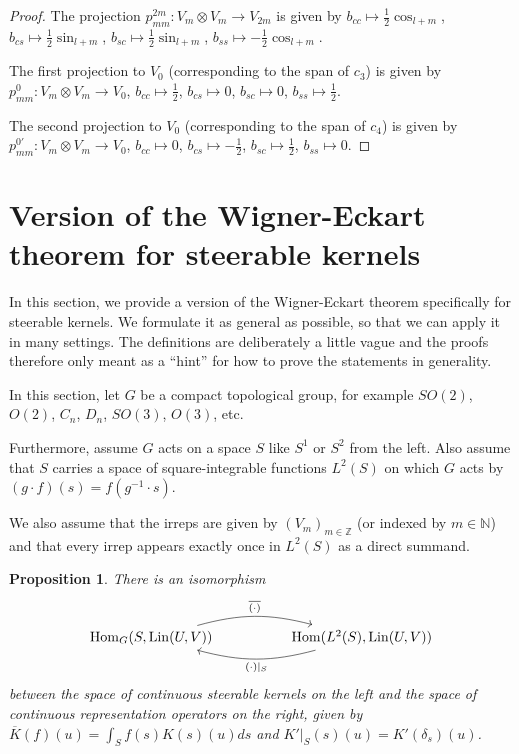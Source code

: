 \documentclass[12pt, a4paper]{article}
\theoremstyle{plain}
\newtheorem{pro}{Proposition}[section]
\theoremstyle{definition}
\theoremstyle{remark}
\newcommand{\N}{\mathds{N}}
\newcommand{\Z}{\mathds{Z}}
\DeclareMathOperator{\lin}{Lin}
\DeclareMathOperator{\Hom}{Hom}
\begin{document}
\begin{proof}
The projection $p_{mm}^{2m}: V_m \otimes V_m \to V_{2m}$ is given by $b_{cc} \mapsto \frac{1}{2} \cos_{l+m}$, $b_{cs} \mapsto \frac{1}{2} \sin_{l+m}$, $b_{sc} \mapsto \frac{1}{2} \sin_{l+m}$, $b_{ss} \mapsto -\frac{1}{2} \cos_{l+m}$.

The first projection to $V_0$ (corresponding to the span of $c_3$) is given by $p_{mm}^{0}: V_m \otimes V_m \to V_0$, $b_{cc} \mapsto \frac{1}{2}$, $b_{cs} \mapsto 0$, $b_{sc} \mapsto 0$, $b_{ss} \mapsto \frac{1}{2}$.

The second projection to $V_0$ (corresponding to the span of $c_4$) is given by $p_{mm}^{0'}: V_m \otimes V_m \to V_0$, $b_{cc} \mapsto 0$, $b_{cs} \mapsto - \frac{1}{2}$, $b_{sc} \mapsto \frac{1}{2}$, $b_{ss} \mapsto 0$.
\end{proof}

\section{Version of the Wigner-Eckart theorem for steerable kernels}

In this section, we provide a version of the Wigner-Eckart theorem specifically for steerable kernels. We formulate it as general as possible, so that we can apply it in many settings. The definitions are deliberately a little vague and the proofs therefore only meant as a ``hint'' for how to prove the statements in generality.

In this section, let $G$ be a compact topological group, for example $SO(2)$, $O(2)$, $C_n$, $D_n$, $SO(3)$, $O(3)$, etc.

Furthermore, assume $G$ acts on a space $S$ like $S^1$ or $S^2$ from the left. Also assume that $S$ carries a space of square-integrable functions $L^2(S)$ on which $G$ acts by $(g \cdot f)(s) = f(g^{-1} \cdot s)$.

We also assume that the irreps are given by $(V_m)_{m \in \Z}$ (or indexed by $m \in \N$) and that every irrep appears exactly once in $L^2(S)$ as a direct summand. 

\begin{pro}\label{steerable kernels = representation operators}
There is an isomorphism
\begin{equation*}
\begin{tikzcd}
\Hom_G(S, \lin(U, V)) \ar[rr, bend left = 15, "\overline{(\cdot)}"] & & \Hom(L^2(S), \lin(U, V)) \ar[ll, bend left = 15, "(\cdot)|_{S}"]
\end{tikzcd}
\end{equation*}
between the space of continuous steerable kernels on the left and the space of continuous representation operators on the right, given by $\overline{K}(f)(u) = \int_{S}f(s)K(s)(u)ds$ and $K'|_{S}(s)(u) = K'(\delta_s)(u)$.
\end{pro}
\end{document}
